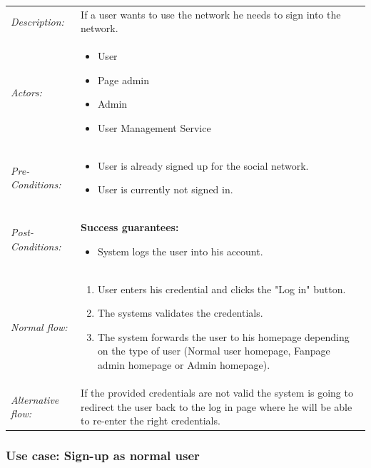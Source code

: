 \documentclass[11pt,a4paper]{report}
\begin{document}
\begin{longtable}{p{} | p{}}
        \hline
        \emph{Description:} & If a user wants to use the network he needs to sign into the network.\\
        \emph{Actors:} & 
            \begin{itemize} 
                \item User
                \item Page admin
                \item Admin
                \item User Management Service
             \end{itemize} \\
        \emph{Pre-Conditions:} & 
            \begin{itemize} 
                \item User is already signed up for the social network.
                \item User is currently not signed in.
             \end{itemize} \\
        \emph{Post-Conditions:} & \textbf{Success guarantees:} 
            \begin{itemize} 
                \item System logs the user into his account.
             \end{itemize} \\
        \emph{Normal flow:} & 
            \begin{enumerate} 
                \item User enters his credential and clicks the "Log in" button.
                \item The systems validates the credentials.
                \item The system forwards the user to his homepage depending on the type of user (Normal user homepage, Fanpage admin homepage or Admin homepage).
             \end{enumerate} \\
        \emph{Alternative flow:} & If the provided credentials are not valid the system is going to redirect the user back to the log in page where he will be able to re-enter the right credentials.\\ 
             \hline
\end{longtable}
\pagebreak
\subsubsection{Use case: Sign-up as normal user}
\end{document}
